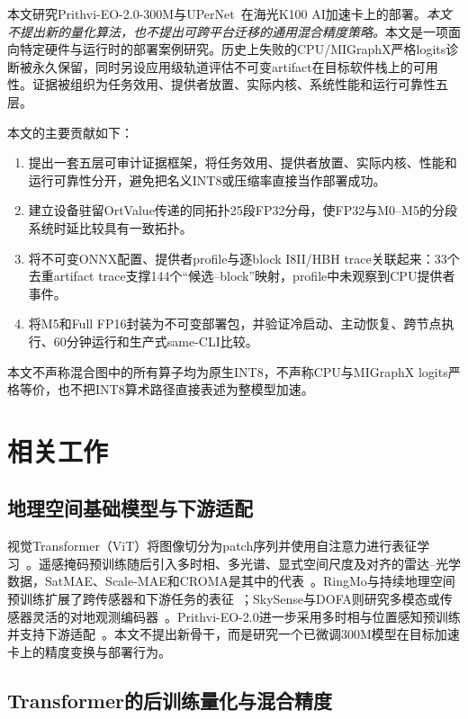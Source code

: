 \documentclass[conference]{IEEEtran}
\begin{document}
本文研究Prithvi-EO-2.0-300M与UPerNet~\cite{upernet2018}在海光K100 AI加速卡上的部署。\textit{本文不提出新的量化算法，也不提出可跨平台迁移的通用混合精度策略。}本文是一项面向特定硬件与运行时的部署案例研究。历史上失败的CPU/MIGraphX严格logits诊断被永久保留，同时另设应用级轨道评估不可变artifact在目标软件栈上的可用性。证据被组织为任务效用、提供者放置、实际内核、系统性能和运行可靠性五层。

本文的主要贡献如下：
\begin{enumerate}
    \item 提出一套五层可审计证据框架，将任务效用、提供者放置、实际内核、性能和运行可靠性分开，避免把名义INT8或压缩率直接当作部署成功。
    \item 建立设备驻留OrtValue传递的同拓扑25段FP32分母，使FP32与M0--M5的分段系统时延比较具有一致拓扑。
    \item 将不可变ONNX配置、提供者profile与逐block I8II/HBH trace关联起来：33个去重artifact trace支撑144个“候选--block”映射，profile中未观察到CPU提供者事件。
    \item 将M5和Full FP16封装为不可变部署包，并验证冷启动、主动恢复、跨节点执行、60分钟运行和生产式same-CLI比较。
\end{enumerate}

本文不声称混合图中的所有算子均为原生INT8，不声称CPU与MIGraphX logits严格等价，也不把INT8算术路径直接表述为整模型加速。

\section{相关工作}
\label{sec:related_work}

\subsection{地理空间基础模型与下游适配}

视觉Transformer（ViT）将图像切分为patch序列并使用自注意力进行表征学习~\cite{vit2021}。遥感掩码预训练随后引入多时相、多光谱、显式空间尺度及对齐的雷达--光学数据，SatMAE、Scale-MAE和CROMA是其中的代表~\cite{satmae2022,scalemae2023,croma2023}。RingMo与持续地理空间预训练扩展了跨传感器和下游任务的表征~\cite{ringmo2023,gfm2023}；SkySense与DOFA则研究多模态或传感器灵活的对地观测编码器~\cite{skysense2024,dofa2024}。Prithvi-EO-2.0进一步采用多时相与位置感知预训练并支持下游适配~\cite{prithvi2024}。本文不提出新骨干，而是研究一个已微调300M模型在目标加速卡上的精度变换与部署行为。

\subsection{Transformer的后训练量化与混合精度}
\end{document}
